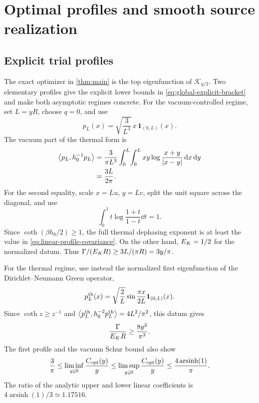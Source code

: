 \section{Optimal profiles and smooth source realization}
\label{sec:construction}

\subsection{Explicit trial profiles}

The exact optimizer in \cref{thm:main} is the top eigenfunction of
$\mathcal K_{y/2}$.  Two elementary profiles give the explicit lower bounds in
\cref{eq:global-explicit-bracket} and make both asymptotic regimes concrete.
For the vacuum-controlled regime, set $L=yR$, choose $q=0$, and use
\begin{equation}
 p_L(x)=\sqrt{\frac{3}{L^3}}\,x\,\mathbf1_{(0,L)}(x).
 \label{eq:linear-profile}
\end{equation}
The vacuum part of the thermal form is
\begin{align}
 \left\langle p_L,h_0^{-1}p_L\right\rangle
 &=\frac{3}{\pi L^3}
 \int_0^L\!\int_0^L xy
 \log\frac{x+y}{\left\lvert x-y\right\rvert}\,\mathrm d x\,\mathrm d y \notag\\
 &=\frac{3L}{2\pi}.
 \label{eq:linear-profile-covariance}
\end{align}
For the second equality, scale $x=Lu$, $y=Lv$, split the unit square across
the diagonal, and use
\begin{equation}
 \int_0^1 t\log\frac{1+t}{1-t}\dd t=1.
\end{equation}
Since $\coth(\beta h_0/2)\geq1$, the full thermal dephasing exponent is at
least the value in \cref{eq:linear-profile-covariance}.  On the other hand,
$E_{K}=1/2$ for the normalized datum.  Thus
$\Gamma/(E_{K} R)\geq3L/(\pi R)=3y/\pi$.

For the thermal regime, use instead the normalized first eigenfunction of the
Dirichlet--Neumann Green operator,
\begin{equation}
 p_L^{\rm th}(x)=\sqrt{\frac2L}\sin\frac{\pi x}{2L}
 \mathbf1_{(0,L)}(x).
 \label{eq:thermal-profile}
\end{equation}
Since $\coth z\geq z^{-1}$ and
$\left\langle p_L^{\rm th},h_0^{-2}p_L^{\rm th}\right\rangle=4L^2/\pi^2$, this datum gives
\begin{equation}
 \frac{\Gamma}{E_{K} R}\geq\frac{8y^2}{\pi^3}.
\end{equation}
The first profile and the vacuum Schur bound also show
\begin{equation}
 \frac{3}{\pi}
 \leq\liminf_{y\downarrow0}\frac{C_{\rm opt}(y)}y
 \leq\limsup_{y\downarrow0}\frac{C_{\rm opt}(y)}y
 \leq\frac{4\operatorname{arsinh}(1)}\pi.
 \label{eq:small-support-gap}
\end{equation}
The ratio of the analytic upper and lower linear coefficients is
$4\operatorname{arsinh}(1)/3\simeq1.17516$.

